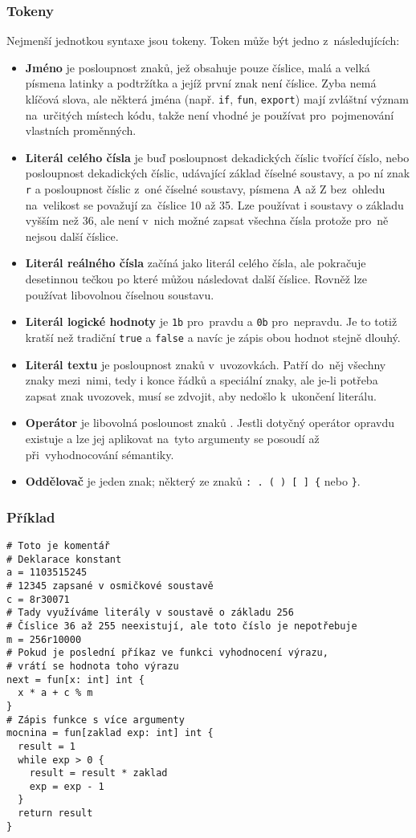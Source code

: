 \documentclass[a4paper,12pt]{article}
\def\circumflex{\char`\^}
\begin{document}
\subsubsection{Tokeny}
Nejmenší jednotkou syntaxe jsou tokeny. Token může být jedno z~následujících:
\begin{itemize}
\item \textbf{Jméno} je posloupnost znaků, jež obsahuje pouze číslice, malá a velká písmena latinky a podtržítka a jejíž první znak není číslice. Zyba nemá klíčová slova, ale některá jména (např. \texttt{if}, \texttt{fun}, \texttt{export}) mají zvláštní význam na~určitých místech kódu, takže není vhodné je používat pro~pojmenování vlastních proměnných.
\item \textbf{Literál celého čísla} je buď posloupnost dekadických číslic tvořící číslo, nebo posloupnost dekadických číslic, udávající základ číselné soustavy, a po ní znak \texttt{r} a posloupnost číslic z~oné číselné soustavy, písmena A až Z bez~ohledu na~velikost se považují za~číslice 10 až 35. Lze používat i soustavy o základu vyšším než 36, ale není v~nich možné zapsat všechna čísla protože pro~ně nejsou další číslice.
\item \textbf{Literál reálného čísla} začíná jako literál celého čísla, ale pokračuje desetinnou tečkou po které můžou následovat další číslice. Rovněž lze používat libovolnou číselnou soustavu.
\item \textbf{Literál logické hodnoty} je \texttt{1b} pro~pravdu a \texttt{0b} pro~nepravdu. Je to totiž kratší než tradiční \texttt{true} a \texttt{false} a navíc je zápis obou hodnot stejně dlouhý.
\item \textbf{Literál textu} je posloupnost znaků v~uvozovkách. Patří do~něj všechny znaky mezi~nimi, tedy i konce řádků a speciální znaky, ale je-li potřeba zapsat znak uvozovek, musí se zdvojit, aby nedošlo k~ukončení literálu.
\item \textbf{Operátor} je libovolná poslounost znaků \uv{\texttt{+-*/\%\&|\textasciitilde\circumflex<>=!}}. Jestli dotyčný operátor opravdu existuje a lze jej aplikovat na~tyto argumenty se posoudí až při~vyhodnocování sémantiky.
\item \textbf{Oddělovač} je jeden znak; některý ze znaků \texttt{: . ( ) [ ] \{} nebo \texttt{\}}.
\end{itemize}

\subsubsection{Příklad}
\begin{verbatim}
# Toto je komentář
# Deklarace konstant
a = 1103515245
# 12345 zapsané v osmičkové soustavě
c = 8r30071
# Tady využíváme literály v soustavě o základu 256
# Číslice 36 až 255 neexistují, ale toto číslo je nepotřebuje
m = 256r10000
# Pokud je poslední příkaz ve funkci vyhodnocení výrazu,
# vrátí se hodnota toho výrazu
next = fun[x: int] int {
  x * a + c % m
}
# Zápis funkce s více argumenty
mocnina = fun[zaklad exp: int] int {
  result = 1
  while exp > 0 {
    result = result * zaklad
    exp = exp - 1
  }
  return result
}
\end{verbatim}
\end{document}
